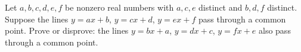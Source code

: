 Let $a,b,c,d,e,f$ be nonzero real numbers with $a,c,e$ distinct and $b,d,f$ distinct. Suppose the lines $y=ax+b$, $y=cx+d$, $y=ex+f$ pass through a common point. Prove or disprove: the lines $y=bx+a$, $y=dx+c$, $y=fx+e$ also pass through a common point.
